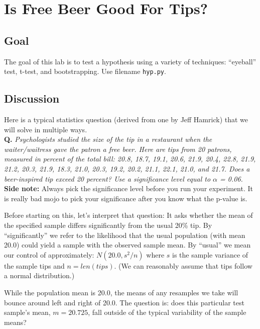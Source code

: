 \chapter{Is Free Beer Good For Tips?}

\setcounter{problem}{1}
\section{Goal}

\begin{fullwidth}

The goal of this lab is to test a hypothesis using a variety of techniques: ``eyeball'' test, t-test, and bootstrapping. Use filename {\tt hyp.py}. 

\section{Discussion}

Here is a typical statistics question (derived from one by Jeff Hamrick) that we will solve in multiple ways.\\

{\bf Q.} {\em Psychologists studied the size of the tip in a restaurant when the waiter/waitress gave the patron a free beer. Here are tips from 20 patrons, measured in percent of the total bill: 20.8, 18.7, 19.1, 20.6, 21.9, 20.4, 22.8,
        21.9, 21.2, 20.3, 21.9, 18.3, 21.0, 20.3,
        19.2, 20.2, 21.1, 22.1, 21.0, and 21.7. Does a beer-inspired tip exceed 20 percent? Use a significance level equal to $\alpha$ = 0.06.}\\
        
{\bf Side note:} Always pick the significance level before you run your experiment. It is really bad mojo to pick your significance after you know what the p-value is.

Before starting on this, let's interpret that question: It asks whether the mean of the specified sample differs significantly from the usual 20\% tip. By ``significantly'' we refer to the likelihood that the usual population (with mean 20.0) could yield a sample with the observed sample mean. By ``usual'' we mean our control of approximately: $N(20.0, s^2/n)$ where $s$ is the sample variance of the sample tips and $n=len(tips)$. (We can reasonably assume  that tips follow a normal distribution.)

While the population mean is 20.0, the means of any resamples we take will bounce around left and right of 20.0.  The question is: does this particular test sample's mean, $m=20.725$, fall outside of the typical variability of the sample means?


\end{fullwidth}
